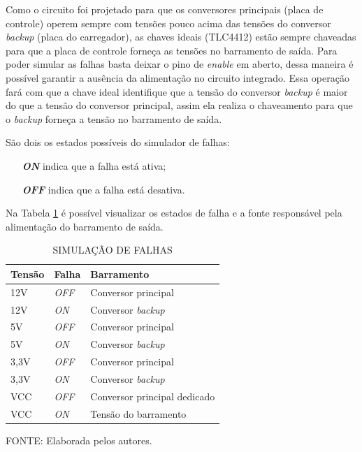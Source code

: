 \documentclass[
	12pt,				%
	openright,			%
	oneside,			%
	a4paper,			%
	english,			%
	french,				%
	spanish,			%
	brazil,				%
	oldfontcommands
	]{abntex2}
\begin{document}
	Como o circuito foi projetado para que os conversores principais (placa de controle) operem sempre com tensões pouco acima das tensões do conversor \textit{backup} (placa do carregador), as chaves ideais (TLC4412) estão sempre chaveadas para que a placa de controle forneça as tensões no barramento de saída. Para poder simular as falhas basta deixar o pino de \textit{enable} em aberto, dessa maneira é possível garantir a ausência da alimentação no circuito integrado. Essa operação fará com que a chave ideal identifique que a tensão do conversor \textit{backup} é maior do que a tensão do conversor principal, assim ela realiza o chaveamento para que o \textit{backup} forneça a tensão no barramento de saída.
	
	São dois os estados possíveis do simulador de falhas:
	
	\begin{itemize}
		\item[\textbf{\textit{ON}}] indica que a falha está ativa;
		\item[\textbf{\textit{OFF}}] indica que a falha está desativa. 
	\end{itemize}
	
	Na Tabela \ref{Tab_Simulador} é possível visualizar os estados de falha e a fonte responsável pela alimentação do barramento de saída.
	
	\begin{table}[th]
	\caption{SIMULAÇÃO DE FALHAS}
	\label{Tab_Simulador}
	\centering
		\begin{tabular}{p{1.5cm}|p{1.5cm}|p{5.5cm}}
			\textbf{Tensão} & \textbf{Falha} & \textbf{Barramento}\\
			\hline
			12V & \textit{OFF} & Conversor principal \\
			12V & \textit{ON} & Conversor \textit{backup} \\
			5V & \textit{OFF} & Conversor principal \\
			5V & \textit{ON} & Conversor \textit{backup} \\
			3,3V & \textit{OFF} & Conversor principal \\
			3,3V & \textit{ON} & Conversor \textit{backup} \\
			VCC & \textit{OFF} & Conversor principal dedicado \\
			VCC & \textit{ON} & Tensão do barramento \\
		\end{tabular}	
	
	\begin{small}
	\vspace{3pt}
		FONTE: Elaborada pelos autores.
	\end{small}
	\end{table}
	\pagebreak
	
\end{document}
